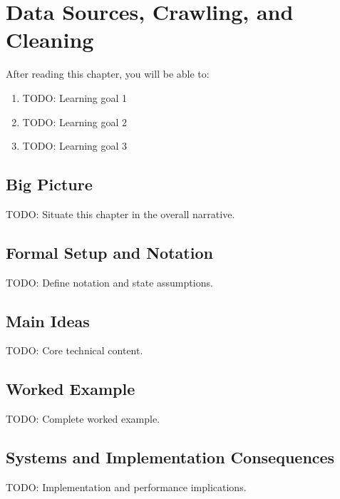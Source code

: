 \chapter{Data Sources, Crawling, and Cleaning}
\label{ch:22}

\begin{keyinsight}
After reading this chapter, you will be able to:
\begin{enumerate}
  \item TODO: Learning goal 1
  \item TODO: Learning goal 2
  \item TODO: Learning goal 3
\end{enumerate}
\end{keyinsight}

\section{Big Picture}
\label{ch:22:sec:big_picture}

TODO: Situate this chapter in the overall narrative.

\section{Formal Setup and Notation}
\label{ch:22:sec:setup}

TODO: Define notation and state assumptions.

\section{Main Ideas}
\label{ch:22:sec:main}

TODO: Core technical content.

\section{Worked Example}
\label{ch:22:sec:example}

TODO: Complete worked example.

\section{Systems and Implementation Consequences}
\label{ch:22:sec:systems}

TODO: Implementation and performance implications.

